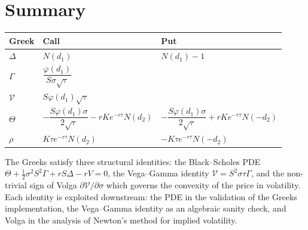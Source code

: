 \documentclass[11pt,a4paper]{article}
\theoremstyle{plain}
\theoremstyle{definition}
\theoremstyle{remark}
\newcommand{\Vega}{\mathcal{V}}
\begin{document}
\section{Summary}

\begin{center}
\renewcommand{\arraystretch}{1.5}
\begin{tabular}{l|l|l}
Greek & Call & Put \\\hline
\(\Delta\) & \(N(d_1)\) & \(N(d_1) - 1\) \\
\(\Gamma\) & \multicolumn{2}{l}{\(\dfrac{\varphi(d_1)}{S\sigma\sqrt{\tau}}\)} \\[0.5em]
\(\Vega\) & \multicolumn{2}{l}{\(S \varphi(d_1) \sqrt{\tau}\)} \\[0.5em]
\(\Theta\)
    & \(-\dfrac{S\varphi(d_1)\sigma}{2\sqrt{\tau}} - rKe^{-r\tau}N(d_2)\)
    & \(-\dfrac{S\varphi(d_1)\sigma}{2\sqrt{\tau}} + rKe^{-r\tau}N(-d_2)\) \\[0.7em]
\(\rho\) & \(K\tau e^{-r\tau} N(d_2)\) & \(-K\tau e^{-r\tau} N(-d_2)\)
\end{tabular}
\end{center}

The Greeks satisfy three structural identities: the Black--Scholes
PDE \(\Theta + \tfrac{1}{2}\sigma^2 S^2 \Gamma + rS\Delta - rV = 0\),
the Vega--Gamma identity \(\Vega = S^2 \sigma \tau \Gamma\), and the
non-trivial sign of Volga \(\partial \Vega / \partial \sigma\) which
governs the convexity of the price in volatility. Each identity is
exploited downstream: the PDE in the validation of the Greeks
implementation, the Vega--Gamma identity as an algebraic sanity
check, and Volga in the analysis of Newton's method for implied
volatility.
\end{document}
